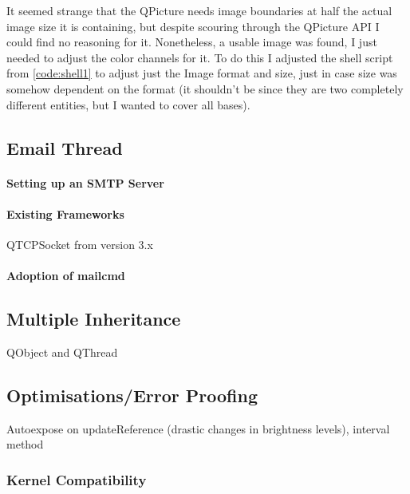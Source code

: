 \documentclass[11pt]{article} %
\begin{document}
It seemed strange that the QPicture needs image boundaries at half the actual image size it is containing, but despite scouring through the QPicture API I could find no reasoning for it. Nonetheless, a usable image was found, I just needed to adjust the color channels for it.
To do this I adjusted the shell script from \cref{code:shell1} to adjust just the Image format and size, just in case size was somehow dependent on the format (it shouldn’t be since they are two completely different entities, but I wanted to cover all bases).
\begin{frame}[fragile]
	
\end{frame}


\subsection{Email Thread}
\paragraph{Setting up an SMTP Server}
\paragraph{Existing Frameworks}{QTCPSocket from version 3.x}
\paragraph{Adoption of mailcmd}
\subsection{Multiple Inheritance}{QObject and QThread}
\subsection{Optimisations/Error Proofing}
Autoexpose on updateReference (drastic changes in brightness levels), interval method
\subsubsection{Kernel Compatibility}
\end{document}
